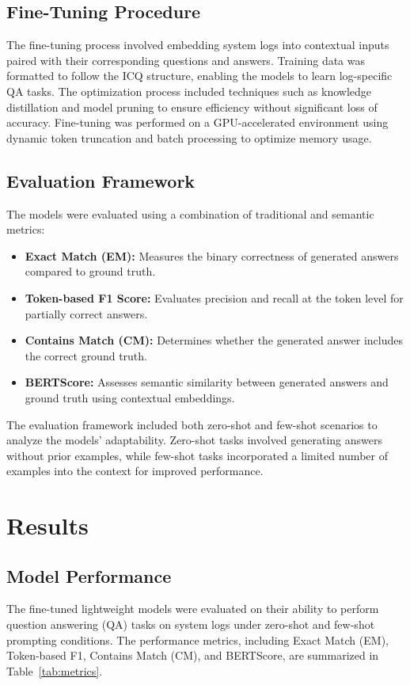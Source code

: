 \documentclass[11pt]{article}
\begin{document}
\subsection{Fine-Tuning Procedure}
The fine-tuning process involved embedding system logs into contextual inputs paired with their corresponding questions and answers. Training data was formatted to follow the ICQ structure, enabling the models to learn log-specific QA tasks. The optimization process included techniques such as knowledge distillation and model pruning to ensure efficiency without significant loss of accuracy. Fine-tuning was performed on a GPU-accelerated environment using dynamic token truncation and batch processing to optimize memory usage.

\subsection{Evaluation Framework}
The models were evaluated using a combination of traditional and semantic metrics:
\begin{itemize}
    \item \textbf{Exact Match (EM):} Measures the binary correctness of generated answers compared to ground truth.
    \item \textbf{Token-based F1 Score:} Evaluates precision and recall at the token level for partially correct answers.
    \item \textbf{Contains Match (CM):} Determines whether the generated answer includes the correct ground truth.
    \item \textbf{BERTScore:} Assesses semantic similarity between generated answers and ground truth using contextual embeddings.
\end{itemize}

The evaluation framework included both zero-shot and few-shot scenarios to analyze the models' adaptability. Zero-shot tasks involved generating answers without prior examples, while few-shot tasks incorporated a limited number of examples into the context for improved performance.

\section{Results}
\subsection{Model Performance}
The fine-tuned lightweight models were evaluated on their ability to perform question answering (QA) tasks on system logs under zero-shot and few-shot prompting conditions. The performance metrics, including Exact Match (EM), Token-based F1, Contains Match (CM), and BERTScore, are summarized in Table~\ref{tab:metrics}.
\end{document}
